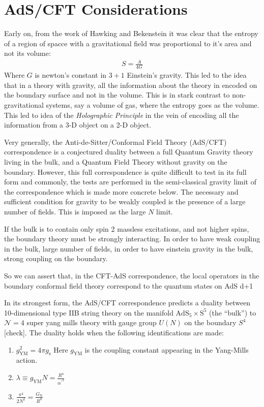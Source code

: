   \section{AdS/CFT Considerations}
  Early on, from the work of Hawking and Bekenstein it was clear that the entropy of a region of spacce with a gravitational field was proportional to it's area and not its volume:
  \begin{align*}
   S=\frac{A}{4G}
  \end{align*}
  Where $G$ is newton's constant in $3+1$ Einstein's gravity. This led to the idea that in a theory with gravity, all the information about the theory in encoded on the boundary surface and not in the volume. This is in stark contrast to non-gravitational systems, say a volume of gas, where the entropy goes as the volume. This led to idea of the \emph{Holographic Principle} in the vein of encoding all the information from a 3-D object on a 2-D object.
  
  Very generally, the Anti-de-Sitter/Conformal Field Theory (AdS/CFT) correspondence is a conjectured duality between a full Quantum Gravity theory living in the bulk, and a Quantum Field Theory without gravity on the boundary. However, this full correspondence is quite difficult to test in its full form and commonly, the tests are performed in the semi-classical gravity limit of the correspondence which is made more concrete below. The necessary and sufficient condition for gravity to be weakly coupled is the presence of a large number of fields. This is imposed as the large $N$ limit. 
  
  If the bulk is to contain only spin 2 massless excitations, and not higher spins, the boundary theory must be strongly interacting. In order to have weak coupling in the bulk, large number of fields, in order to have einstein gravity in the bulk, strong coupling on the boundary.
  
  So we can assert that, in the CFT-AdS correspondence, the local operators in the boundary conformal field theory correspond to the quantum states on AdS d+1

  
  In its strongest form, the AdS/CFT correspondence predicts a duality between 10-dimensional type IIB string theory on the manifold $\text{AdS}_5 \times \text{S}^5$ (the ``bulk'') to $\mathcal{N}=4$ super yang mills theory with gauge group $U(N)$ on the boundary $S^4$ [check]. The duality holds when the following identifications are made:
  
  \begin{enumerate}
   \item $g_\text{YM}^2=4\pi g_\text{s}$ Here $g_\text{YM}$ is the coupling constant appearing in the Yang-Mills action.
   \item $\lambda \equiv g_\text{YM} N = \frac{R^4}{{\alpha^\prime}^2} $
   \item $\frac{\pi^4}{2N^2}=\frac{G_\text{N}}{R^8}$
  \end{enumerate}

